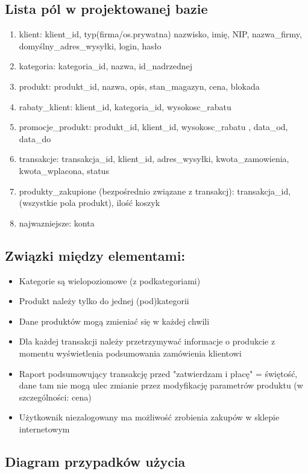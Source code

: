 \subsection{Lista pól w projektowanej bazie}
\begin{enumerate}
\item klient: klient\_id, typ(firma/os.prywatna) nazwisko, imię, NIP, nazwa\_firmy, domyślny\_adres\_wysyłki, login, hasło
\item kategoria: kategoria\_id, nazwa, id\_nadrzednej
\item produkt: produkt\_id, nazwa, opis, stan\_magazyn, cena, blokada

\item rabaty\_klient: klient\_id, kategoria\_id, wysokosc\_rabatu 
\item promocje\_produkt: produkt\_id, klient\_id, wysokosc\_rabatu , data\_od, data\_do 

\item transakcje: transakcja\_id, klient\_id, adres\_wysyłki, kwota\_zamowienia, kwota\_wplacona, status
\item produkty\_zakupione (bezpośrednio związane z transakcj): transakcja\_id, (wszystkie pola produkt), ilość
koszyk

\item najwazniejsze: konta
\end{enumerate}
\subsection{Związki między elementami:}
\begin{itemize}
\item Kategorie są wielopoziomowe (z podkategoriami)
\item Produkt należy tylko do jednej (pod)kategorii
\item Dane produktów mogą zmieniać się w każdej chwili
\item Dla każdej transakcji należy przetrzymywać informacje o produkcie z momentu wyświetlenia podsumowania zamówienia klientowi
\item Raport podsumowujący transakcję przed "zatwierdzam i płacę" = świętość, dane tam nie mogą ulec zmianie przez modyfikację parametrów produktu (w szczególności: cena)
\item Użytkownik niezalogowany ma możliwość zrobienia zakupów w sklepie internetowym
\end{itemize}

\subsection{Diagram przypadków użycia}

